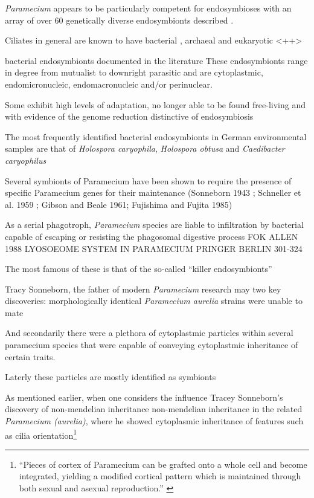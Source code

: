\textit{Paramecium} appears to be particularly competent for endosymbioses with an array of over 60 
genetically diverse endosymbionts described \citep{Gortz2009}.

Ciliates in general are known to have bacterial \citep{Gortz2009}, archaeal \citep{Wrede2012} and eukaryotic \citep{}<++>





bacterial endosymbionts documented in the literature \citep{Gortz2009}
These endosymbionts range in degree from mutualist to downright parasitic and are cytoplastmic, endomicronucleic,
endomacronucleic and/or perinuclear. 

Some exhibit high levels of adaptation, no longer able to be found free-living and with evidence of the genome reduction
distinctive of endosymbiosis \citep{Gortz2009} %

The most frequently identified bacterial endosymbionts in German environmental samples are that of \textit{Holospora  caryophila},
\textit{Holospora obtusa} and \textit{Caedibacter caryophilus}


Several symbionts of Paramecium have been shown to require the presence of specific Paramecium genes for their maintenance (Sonneborn 1943 ; Schneller et al. 1959 ; Gibson and Beale 1961; Fujishima and Fujita 1985)


As a serial phagotroph, \textit{Paramecium} species are liable to infiltration by bacterial capable of escaping or resisting
the phagosomal digestive process FOK ALLEN 1988 LYOSOEOME SYSTEM IN PARAMECIUM PRINGER BERLIN 301-324






The most famous of these is that of the so-called ``killer endosymbionts'' 


Tracy Sonneborn, the father of modern \textit{Paramecium} research may two key discoveries:
morphologically identical \textit{Paramecium aurelia} strains were unable to mate 

And secondarily there were a plethora of cytoplastmic particles within several paramecium species
that were capable of conveying cytoplastmic inheritance of certain traits.

Laterly these particles are mostly identified as symbionts 


\citep{Corliss1974} 





As mentioned earlier, when one considers the influence Tracey Sonneborn's discovery of non-mendelian
inheritance non-mendelian inheritance in the related \textit{Paramecium (aurelia)}, where he showed
cytoplasmic inheritance of features such as cilia orientation\footnote{``Pieces of cortex of Paramecium can be grafted onto a whole cell and
become integrated, yielding a modified cortical pattern which is maintained through both sexual and asexual reproduction.'' \citep{Beisson1965}}

